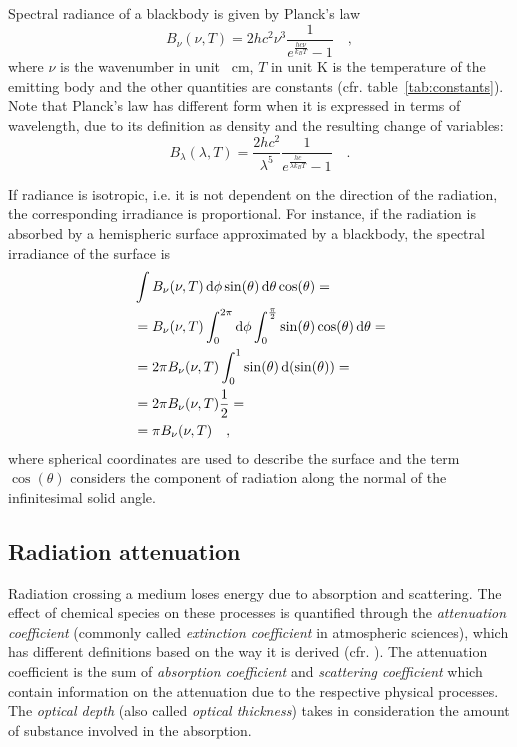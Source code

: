 \documentclass[a4paper,10pt,twocolumn,\classoptions]{article}
\begin{document}
Spectral radiance of a blackbody is given by Planck's law
\begin{equation}
  \label{eq:spectral_radiance_blackbody}
  B_\nu (\nu, T) = 2 h c^2 \nu^3 \frac{1}{e^\frac{h c \nu}{k_B T} - 1}
  \quad ,
\end{equation}
where $\nu$ is the wavenumber in unit \unit{\per\centi\metre}, $T$ in unit \unit{\kelvin} is the temperature of the emitting body and the other quantities are constants (cfr. table~\ref{tab:constants}).
Note that Planck's law has different form when it is expressed in terms of wavelength, due to its definition as density and the resulting change of variables:
\begin{equation}
  \label{eq:spectral_radiance_blackbody_lambda}
  B_\lambda (\lambda, T) = \frac{2 h c^2}{\lambda^5} \frac{1}{e^\frac{h c}{\lambda k_B T} - 1}
  \quad .
\end{equation}

If radiance is isotropic, i.e. it is not dependent on the direction of the radiation, the corresponding irradiance is proportional. For instance, if the radiation is absorbed by a hemispheric surface approximated by a blackbody, the spectral irradiance of the surface is
\begin{equation}
  \label{eq:spectral_irradiance_blackbody_hemisphere}
  \begin{split}
    & \int B_\nu (\nu, T) \odif{\phi} \sin(\theta) \odif{\theta} \cos(\theta) = \\
    & = B_\nu (\nu, T) \int_0^{2\pi} \odif{\phi} \int_0^\frac{\pi}{2} \sin(\theta) \cos(\theta) \odif{\theta} = \\
    & = 2 \pi B_\nu (\nu, T) \int_0^1 \sin(\theta) \odif{(\sin(\theta))} = \\
    & = 2 \pi B_\nu (\nu, T) \frac{1}{2} = \\
    & = \pi B_\nu (\nu, T)
    \quad ,
  \end{split}
\end{equation}
where spherical coordinates are used to describe the surface and the term $\cos(\theta)$ considers the component of radiation along the normal of the infinitesimal solid angle.



\subsection{Radiation attenuation}
\label{sec:Radiation attenuation}
Radiation crossing a medium loses energy due to absorption and scattering. The effect of chemical species on these processes is quantified through the \emph{attenuation coefficient} (commonly called \emph{extinction coefficient} in atmospheric sciences), which has different definitions based on the way it is derived (cfr. \cite[44]{Catling}). The attenuation coefficient is the sum of \emph{absorption coefficient} and \emph{scattering coefficient} which contain information on the attenuation due to the respective physical processes. The \emph{optical depth} (also called \emph{optical thickness}) takes in consideration the amount of substance involved in the absorption.
\end{document}
